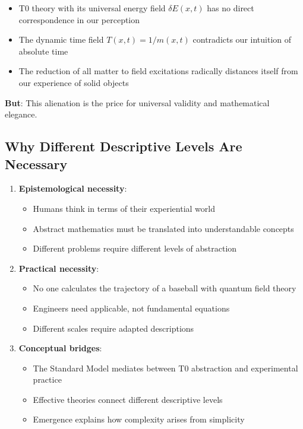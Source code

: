 	\begin{itemize}
		\item T0 theory with its universal energy field $\delta E(x,t)$ has no direct correspondence in our perception
		\item The dynamic time field $T(x,t) = 1/m(x,t)$ contradicts our intuition of absolute time
		\item The reduction of all matter to field excitations radically distances itself from our experience of solid objects
	\end{itemize}
	
	\textbf{But}: This alienation is the price for universal validity and mathematical elegance.
	
	\subsection{Why Different Descriptive Levels Are Necessary}
	
	\begin{enumerate}
		\item \textbf{Epistemological necessity}:
		\begin{itemize}
			\item Humans think in terms of their experiential world
			\item Abstract mathematics must be translated into understandable concepts
			\item Different problems require different levels of abstraction
		\end{itemize}
		
		\item \textbf{Practical necessity}:
		\begin{itemize}
			\item No one calculates the trajectory of a baseball with quantum field theory
			\item Engineers need applicable, not fundamental equations
			\item Different scales require adapted descriptions
		\end{itemize}
		
		\item \textbf{Conceptual bridges}:
		\begin{itemize}
			\item The Standard Model mediates between T0 abstraction and experimental practice
			\item Effective theories connect different descriptive levels
			\item Emergence explains how complexity arises from simplicity
		\end{itemize}
	\end{enumerate}
	
